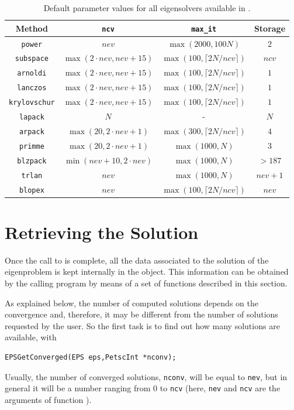 \begin{table}
\centering
\begin{tabular}{cccc} \hline
Method   & \texttt{ncv} & \texttt{max\_it} & Storage \\ \hline
\texttt{power}    &  $nev$ & $\max(2000,100N)$ & $2$ \\ 
\texttt{subspace} &  $\max(2\cdot nev,nev+15)$ & $\max(100,\lceil 2N/ncv \rceil)$ & $ncv$ \\ 
\texttt{arnoldi}  &  $\max(2\cdot nev,nev+15)$ & $\max(100,\lceil 2N/ncv \rceil)$ & $1$ \\ 
\texttt{lanczos}  &  $\max(2\cdot nev,nev+15)$ & $\max(100,\lceil 2N/ncv \rceil)$ & $1$ \\ 
\texttt{krylovschur} & $\max(2\cdot nev,nev+15)$ & $\max(100,\lceil 2N/ncv \rceil)$ & $1$ \\ 
\hline
\texttt{lapack}   &  $N$ &         -         & $N$  \\ 
\texttt{arpack}   &  $\max(20,2\!\cdot\!nev\!+\!\!1)$ & $\max(300,\lceil 2N/ncv\rceil)$ & $4$ \\ 
\texttt{primme}   &  $\max(20,2\!\cdot\!nev\!+\!\!1)$ & $\max(1000,N)$ & $3$ \\ 
\texttt{blzpack}  &  $\min(nev\!+\!\!10,2\!\cdot\!nev)$ & $\max(1000,N)$ & $>187$ \\ 
\texttt{trlan}    &  $nev$ & $\max(1000,N)$ & $nev+1$ \\
\texttt{blopex}   &  $nev$ & $\max(100,\lceil 2N/ncv \rceil)$ & $nev$ \\ \hline
\end{tabular}
\caption{\label{tab:defaults}Default parameter values for all eigensolvers available in \slepc.}
\end{table}

\section{Retrieving the Solution}
\label{sec:retrsol}

Once the call to  is complete, all the data associated to the solution of the eigenproblem is kept internally in the  object. This information can be obtained by the calling program by means of a set of functions described in this section.

	As explained below, the number of computed solutions depends on the convergence and, therefore, it may be different from the number of solutions requested by the user. So the first task is to find out how many solutions are available, with
	\begin{Verbatim}[fontsize=\small]
	EPSGetConverged(EPS eps,PetscInt *nconv);
	\end{Verbatim}
Usually, the number of converged solutions, \texttt{nconv}, will be equal to \texttt{nev}, but in general it will be a number ranging from 0 to \texttt{ncv} (here, \texttt{nev} and \texttt{ncv} are the arguments of function ).

